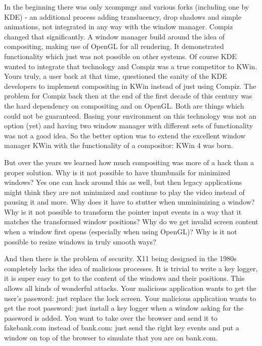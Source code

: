 In the beginning there was only xcompmgr and various forks (including one by KDE) - an additional process adding translucency, drop shadows and simple animations, not integrated in any way with the window manager. Compiz changed that significantly. A window manager build around the idea of compositing, making use of OpenGL for all rendering. It demonstrated functionality which just was not possible on other systems. Of course KDE wanted to integrate that technology and Compiz was a true competitor to KWin. Yours truly, a user back at that time, questioned the sanity of the KDE developers to implement compositing in KWin instead of just using Compiz. The problem for Compiz back then at the end of the first decade of this century was the hard dependency on compositing and on OpenGL. Both are things which could not be guaranteed. Basing your environment on this technology was not an option (yet) and having two window manager with different sets of functionality was not a good idea. So the better option was to extend the excellent window manager KWin with the functionality of a compositor: KWin 4 was born.

But over the years we learned how much compositing was more of a hack than a proper solution. Why is it not possible to have thumbnails for minimized windows? Yes one can hack around this as well, but then legacy applications might think they are not minimized and continue to play the video instead of pausing it and more. Why does it have to stutter when unminimizing a window? Why is it not possible to transform the pointer input events in a way that it matches the transformed window positions? Why do we get invalid screen content when a window first opens (especially when using OpenGL)? Why is it not possible to resize windows in truly smooth ways?

And then there is the problem of security. X11 being designed in the 1980s completely lacks the idea of malicious processes. It is trivial to write a key logger, it is super easy to get to the content of the windows and their positions. This allows all kinds of wonderful attacks. Your malicious application wants to get  the user's password: just replace the lock screen. Your malicious application wants to get the root password: just install a key logger when a window asking for the password is added. You want to take over the browser and send it to fakebank.com instead of bank.com: just send the right key events and put a window on top of the browser to simulate that you are on bank.com.

